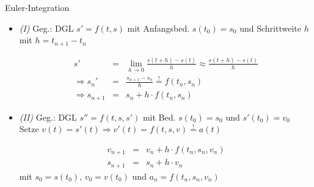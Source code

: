 \documentclass{beamer}
\begin{document}
\begin{frame}{Euler-Integration}
   \begin{itemize}
        \item \emph{(I)} Geg.: DGL $s' = f (t, s)$ mit Anfangsbed. $s (t_0) = s_0$ und 
        Schrittweite $h$ mit $h = t_{n+1} - t_n$
        
        \begin{eqnarray}
                    s'      &=& \lim_{h \rightarrow 0} \frac{s (t + h) - s (t)}{h}
                                \approx \frac{s (t + h) - s (t)}{h} \\
        \Rightarrow s_n'    &=& \frac{s_{n+1} - s_n}{h} \stackrel{!} = f (t_n, s_n) \\
        \Rightarrow s_{n+1} &=& s_n + h \cdot f (t_n, s_n) \label{eq:tan}   %
        \end{eqnarray}
        
        \item \emph{(II)} Geg.: DGL $s'' = f (t, s, s')$ mit Bed. $s (t_0) = s_0$ und 
        $s' (t_0) = v_0$ \\
        Setze $v (t) = s' (t) \Rightarrow v' (t) = f (t, s, v) \stackrel{!}= a (t)$
        
        \begin{eqnarray}
        v_{n+1} &=& v_n + h \cdot f (t_n, s_n, v_n) \label{eq:v}\\   %
        s_{n+1} &=& s_n + h \cdot v_n \label{eq:s}
        \end{eqnarray}
        mit $s_0 = s (t_0)$, $v_0 = v (t_0)$ und $a_n = f (t_n, s_n, v_n)$
        
   \end{itemize}
\end{frame}
\end{document}
